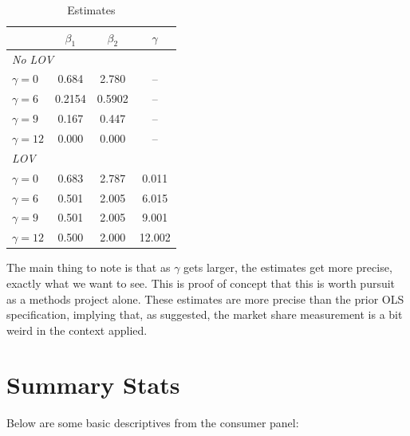 \documentclass[11pt]{article}
\theoremstyle{definition}
\theoremstyle{remark}
\begin{document}
\begin{table}[htbp]
    \centering
    \caption{Estimates}
    \label{tab:estimates}
    \begin{tabular}{lccc}
        \toprule
         & $\beta_1$ & $\beta_2$ & $\gamma$ \\
        \midrule
        \multicolumn{3}{l}{\textit{No LOV }} \\[0.5em]
        $\gamma=0$  & 0.684 & 2.780 & --\\
        $\gamma=6$  & 0.2154 & 0.5902 & --\\
        $\gamma=9$  & 0.167 & 0.447 & --\\
        $\gamma=12$ & 0.000 & 0.000 & --\\[0.5em]
        \multicolumn{3}{l}{\textit{LOV }} \\[0.5em]
        $\gamma=0$  & 0.683 & 2.787 & 0.011 \\
        $\gamma=6$  & 0.501 & 2.005 & 6.015 \\
        $\gamma=9$  & 0.501 & 2.005 & 9.001 \\
        $\gamma=12$ & 0.500 & 2.000 & 12.002\\
        \bottomrule
    \end{tabular}
\end{table}

The main thing to note is that as $\gamma$ gets larger, the estimates get more precise, exactly what we want to see. This is proof of concept that this is worth pursuit as a methods project alone. These estimates are more precise than the prior OLS specification, implying that, as suggested, the market share measurement is a bit weird in the context applied.

\section{Summary Stats}
Below are some basic descriptives from the consumer panel:
\end{document}
